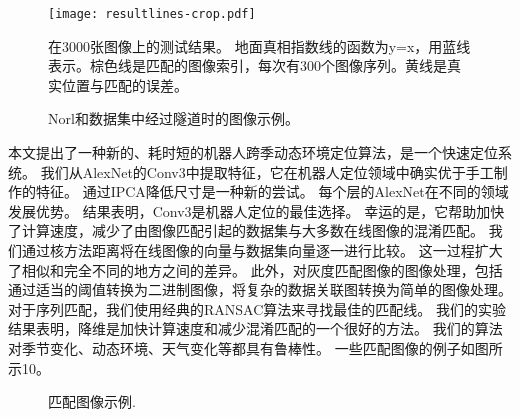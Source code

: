 \begin{figure}[H]
  \centering
  \texttt{[image: resultlines-crop.pdf]}
  \caption{在3000张图像上的测试结果。 地面真相指数线的函数为y=x，用蓝线表示。棕色线是匹配的图像索引，每次有300个图像序列。黄线是真实位置与匹配的误差。}
  \label{fig:Experimentresult}
\end{figure}


\begin{figure}[H]
 \centering
 \caption{Norl和数据集中经过隧道时的图像示例。}
 \label{fig:tunnel}
\end{figure}

本文提出了一种新的、耗时短的机器人跨季动态环境定位算法，是一个快速定位系统。 我们从AlexNet的Conv3中提取特征，它在机器人定位领域中确实优于手工制作的特征。 通过IPCA降低尺寸是一种新的尝试。 每个层的AlexNet在不同的领域发展优势。 结果表明，Conv3是机器人定位的最佳选择。 幸运的是，它帮助加快了计算速度，减少了由图像匹配引起的数据集与大多数在线图像的混淆匹配。 我们通过核方法距离将在线图像的向量与数据集向量逐一进行比较。 这一过程扩大了相似和完全不同的地方之间的差异。 此外，对灰度匹配图像的图像处理，包括通过适当的阈值转换为二进制图像，将复杂的数据关联图转换为简单的图像处理。对于序列匹配，我们使用经典的RANSAC算法来寻找最佳的匹配线。 我们的实验结果表明，降维是加快计算速度和减少混淆匹配的一个很好的方法。 我们的算法对季节变化、动态环境、天气变化等都具有鲁棒性。 一些匹配图像的例子如图所示10。

\begin{figure}[H]
 \centering
 \caption{匹配图像示例.}
 \label{fig:scene}
\end{figure}
